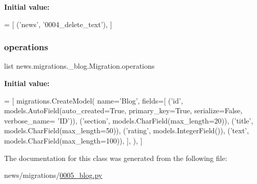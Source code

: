 {\bfseries Initial value\+:}
\begin{DoxyCode}
=  [
        (\textcolor{stringliteral}{'news'}, \textcolor{stringliteral}{'0004\_delete\_text'}),
    ]
\end{DoxyCode}
\mbox{\label{classnews_1_1migrations_1_10005__blog_1_1_migration_ac1237edc72e8630319b2134ee14c3305}} 
\subsubsection{\texorpdfstring{operations}{operations}}
{\footnotesize\ttfamily list news.\+migrations.\+\_\+blog.\+Migration.\+operations\hspace{0.3cm}{\ttfamily [static]}}

{\bfseries Initial value\+:}
\begin{DoxyCode}
=  [
        migrations.CreateModel(
            name=\textcolor{stringliteral}{'Blog'},
            fields=[
                (\textcolor{stringliteral}{'id'}, models.AutoField(auto\_created=\textcolor{keyword}{True}, primary\_key=\textcolor{keyword}{True}, serialize=\textcolor{keyword}{False}, verbose\_name=\textcolor{stringliteral}{
      'ID'})),
                (\textcolor{stringliteral}{'section'}, models.CharField(max\_length=20)),
                (\textcolor{stringliteral}{'title'}, models.CharField(max\_length=50)),
                (\textcolor{stringliteral}{'rating'}, models.IntegerField()),
                (\textcolor{stringliteral}{'text'}, models.CharField(max\_length=100)),
            ],
        ),
    ]
\end{DoxyCode}


The documentation for this class was generated from the following file\+:\begin{DoxyCompactItemize}
\item 
news/migrations/\mbox{\hyperlink{0005__blog_8py}{0005\+\_\+blog.\+py}}\end{DoxyCompactItemize}
